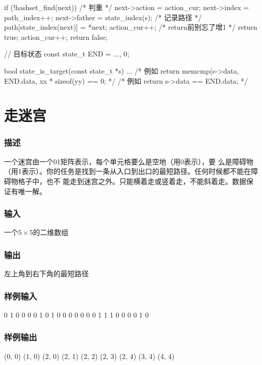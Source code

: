 \begin{Codex}[label=bfs_template.c]
{{{            if (!hashset_find(next)) { /* 判重 */
                next->action = action_cur;
                next->index = path_index++;
                next->father = state_index(s);
                /* 记录路径 */
                path[state_index(next)] = *next;
                action_cur++;  /* return前别忘了增1 */
                return true;
            }
        }
        action_cur++;
    }
    return false;
}

// 目标状态
const state_t END = {..., 0};

bool state_is_target(const state_t *s) {
    ...
    /* 例如 return memcmp(s->data, END.data, xx * sizeof(yy) == 0; */
    /* 例如 return s->data == END.data; */
}
\end{Codex}

\section{走迷宫} %

\subsubsection{描述}
一个迷宫由一个01矩阵表示，每个单元格要么是空地（用0表示），要
么是障碍物（用1表示）。你的任务是找到一条从入口到出口的最短路径。任何时候都不能在障碍物格子中，也不
能走到迷宫之外。只能横着走或竖着走，不能斜着走。数据保证有唯一解。

\subsubsection{输入}
一个$5 \times 5$的二维数组

\subsubsection{输出}
左上角到右下角的最短路径

\subsubsection{样例输入}
\begin{Code}
0 1 0 0 0
0 1 0 1 0
0 0 0 0 0
0 1 1 1 0
0 0 0 1 0
\end{Code}

\subsubsection{样例输出}
(0, 0)
(1, 0)
(2, 0)
(2, 1)
(2, 2)
(2, 3)
(2, 4)
(3, 4)
(4, 4)

